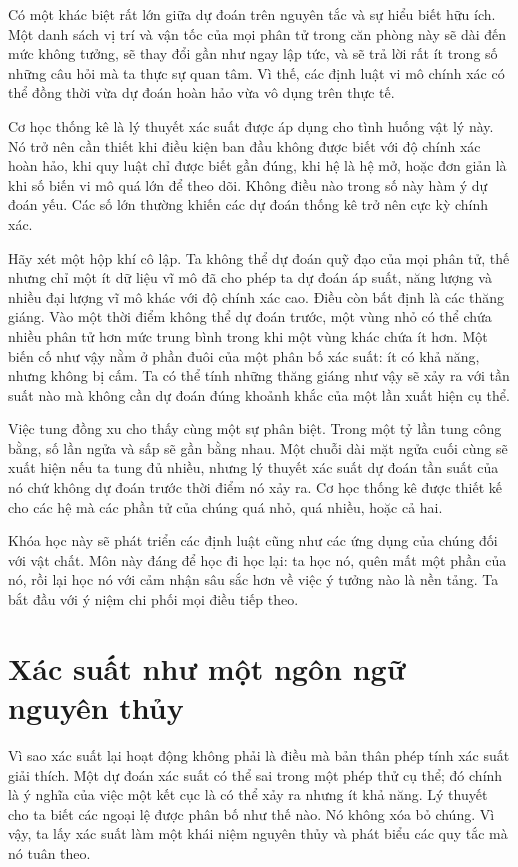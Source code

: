 Có một khác biệt rất lớn giữa dự đoán trên nguyên tắc và sự hiểu biết hữu ích. Một danh sách vị trí và vận tốc của mọi phân tử trong căn phòng này sẽ dài đến mức không tưởng, sẽ thay đổi gần như ngay lập tức, và sẽ trả lời rất ít trong số những câu hỏi mà ta thực sự quan tâm. Vì thế, các định luật vi mô chính xác có thể đồng thời vừa dự đoán hoàn hảo vừa vô dụng trên thực tế.

Cơ học thống kê là lý thuyết xác suất được áp dụng cho tình huống vật lý này. Nó trở nên cần thiết khi điều kiện ban đầu không được biết với độ chính xác hoàn hảo, khi quy luật chỉ được biết gần đúng, khi hệ là hệ mở, hoặc đơn giản là khi số biến vi mô quá lớn để theo dõi. Không điều nào trong số này hàm ý dự đoán yếu. Các số lớn thường khiến các dự đoán thống kê trở nên cực kỳ chính xác.

Hãy xét một hộp khí cô lập. Ta không thể dự đoán quỹ đạo của mọi phân tử, thế nhưng chỉ một ít dữ liệu vĩ mô đã cho phép ta dự đoán áp suất, năng lượng và nhiều đại lượng vĩ mô khác với độ chính xác cao. Điều còn bất định là các thăng giáng. Vào một thời điểm không thể dự đoán trước, một vùng nhỏ có thể chứa nhiều phân tử hơn mức trung bình trong khi một vùng khác chứa ít hơn. Một biến cố như vậy nằm ở phần đuôi của một phân bố xác suất: ít có khả năng, nhưng không bị cấm. Ta có thể tính những thăng giáng như vậy sẽ xảy ra với tần suất nào mà không cần dự đoán đúng khoảnh khắc của một lần xuất hiện cụ thể.

Việc tung đồng xu cho thấy cùng một sự phân biệt. Trong một tỷ lần tung công bằng, số lần ngửa và sấp sẽ gần bằng nhau. Một chuỗi dài mặt ngửa cuối cùng sẽ xuất hiện nếu ta tung đủ nhiều, nhưng lý thuyết xác suất dự đoán tần suất của nó chứ không dự đoán trước thời điểm nó xảy ra. Cơ học thống kê được thiết kế cho các hệ mà các phần tử của chúng quá nhỏ, quá nhiều, hoặc cả hai.

Khóa học này sẽ phát triển các định luật cũng như các ứng dụng của chúng đối với vật chất. Môn này đáng để học đi học lại: ta học nó, quên mất một phần của nó, rồi lại học nó với cảm nhận sâu sắc hơn về việc ý tưởng nào là nền tảng. Ta bắt đầu với ý niệm chi phối mọi điều tiếp theo.

\section{Xác suất như một ngôn ngữ nguyên thủy}

Vì sao xác suất lại hoạt động không phải là điều mà bản thân phép tính xác suất giải thích. Một dự đoán xác suất có thể sai trong một phép thử cụ thể; đó chính là ý nghĩa của việc một kết cục là có thể xảy ra nhưng ít khả năng. Lý thuyết cho ta biết các ngoại lệ được phân bố như thế nào. Nó không xóa bỏ chúng. Vì vậy, ta lấy xác suất làm một khái niệm nguyên thủy và phát biểu các quy tắc mà nó tuân theo.

